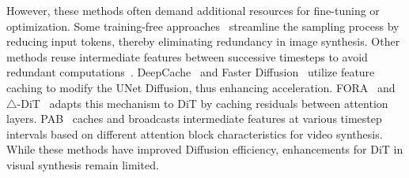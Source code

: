 However, these methods often demand additional resources for fine-tuning or optimization. Some training-free approaches~\cite{bolya2023token, wang2024attention} streamline the sampling process by reducing input tokens, thereby eliminating redundancy in image synthesis. Other methods reuse intermediate features between successive timesteps to avoid redundant computations~\cite{wimbauer2024cache, so2023frdiff, zhang2024cross}. DeepCache~\cite{xu2018deepcache} and Faster Diffusion~\cite{li2023faster} utilize feature caching to modify the UNet Diffusion, thus enhancing acceleration. FORA~\cite{selvaraju2024fora} and $\triangle$-DiT~\cite{chen2024delta} adapts this mechanism to DiT by caching residuals between attention layers. PAB~\cite{zhao2024real} caches and broadcasts intermediate features at various timestep intervals based on different attention block characteristics for video synthesis. While these methods have improved Diffusion efficiency, enhancements for DiT in visual synthesis remain limited.